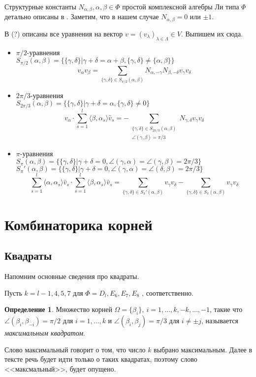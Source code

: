\documentclass[a4paper,12pt]{amsart}
\theoremstyle{plain}
\theoremstyle{remark}
\theoremstyle{definition}
\newtheorem{definition}{Определение}
\begin{document}
Структурные константы $N_{\alpha,\beta}, \alpha,\beta \in \Phi$ простой комплексной алгебры Ли типа $\Phi$ детально описаны в \cite{Vavilov}. Заметим, что в нашем случае $N_{\alpha,\beta} = 0$ или $\pm1$.

В (?) описаны все уравнения на вектор $v=(v_{\lambda})_{\lambda \in \Lambda} \in V$. Выпишем их сюда.
\begin{itemize}
  \item $\pi/2$-уравнения\\
    $S_{\pi/2}(\alpha,\beta)=\{\{\gamma,\delta\} | \gamma + \delta = \alpha + \beta, \{\gamma,\delta\}\neq\{\alpha,\beta\}\}$
    $$v_{\alpha}v_{\beta} = \sum_{\{\gamma,\delta\} \in S_{\pi/2}(\alpha,\beta)}N_{\alpha,-\gamma}N_{\beta,-\delta}v_{\gamma}v_{\delta}$$

  \item $2\pi/3$-уравнения\\
  $S_{2\pi/3}(\alpha,\beta)=\{\{\gamma,\delta\} | \gamma + \delta = \alpha, \{\gamma,\delta\}\neq 0\}$
    $$v_{\alpha}\cdot\sum_{s=1}^{l}\langle\beta,\alpha_s\rangle\hat{v}_s = -\sum_{\substack{\{\gamma,\delta\} \in S_{2\pi/3}(\alpha,\beta)\\ \angle(\gamma,\beta)=\pi/3}}N_{\gamma,\delta}v_{\gamma}v_{\delta}$$

  \item $\pi$-уравнения\\
  $S_{\pi}(\alpha,\beta)=\{\{\gamma,\delta\} | \gamma + \delta = 0, \angle(\gamma,\alpha)=\angle(\gamma,\beta)=2\pi/3\}$\\
  $S_{\pi}'(\alpha,\beta)=\{\{\gamma,\delta\} | \gamma + \delta = 0, \angle(\gamma,\alpha)=\angle(\delta,\beta)=2\pi/3\}$
     $$\sum_{s=1}^{l}\langle\alpha,\alpha_s\rangle\hat{v}_s\cdot\sum_{s=1}^{l}\langle\beta,\alpha_s\rangle\hat{v}_s = \sum_{\{\gamma,\delta\} \in S_{\pi}'(\alpha,\beta)}v_{\gamma}v_{\delta} - \sum_{\{\gamma,\delta\} \in S_{\pi}(\alpha,\beta)}v_{\gamma}v_{\delta}$$
\end{itemize}




\section{Комбинаторика корней}
\subsection{Квадраты}
Напомним основные сведения про квадраты.

Пусть $k = l-1,4,5,7$ для $\Phi = D_l ,E_6 ,E_7 ,E_8$ , соответственно.
\begin{definition}
Множество корней $\Omega=\{\beta_i\},~ i = 1, \ldots ,k,-k, \ldots ,-1$, такие что $\angle(\beta_i,\beta_{-i}) = \pi/2$
для $i = 1, \ldots ,k$ и $\angle(\beta_i,\beta_j) = \pi/3$ для $i \neq \pm j$, называется \emph{максимальным квадратом}.
\end{definition}
Слово максимальный говорит о том, что число $k$ выбрано максимальным. Далее в тексте речь будет идти только о таких квадратах, поэтому слово <<максмальный>>, будет опущено.
\end{document}
